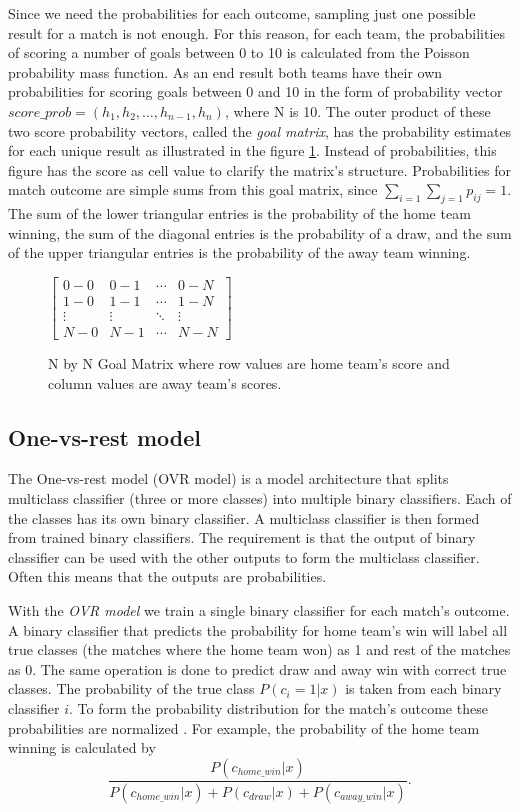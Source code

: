 Since we need the probabilities for each outcome, sampling just one possible result for a match is not enough. For this reason, for each team, the probabilities of scoring a number of goals between 0 to 10 is calculated from the Poisson probability mass function. As an end result both teams have their own probabilities for scoring goals between 0 and 10 in the form of probability vector $score\_prob = \left( h _ { 1 } , h _ { 2 } , \dots , h _ { n - 1 } , h _ { n } \right)$, where N is 10. The outer product of these two score probability vectors, called the \textit{goal matrix}, has the probability estimates for each unique result as illustrated in the figure \ref{fig:goal_matrix}. Instead of probabilities, this figure has the score as cell value to clarify the matrix's structure. Probabilities for match outcome are simple sums from this goal matrix, since $\sum_{i=1}\sum_{j=1}p_{ij} = 1$. The sum of the lower triangular entries is the probability of the home team winning, the sum of the diagonal entries is the probability of a draw, and the sum of the upper triangular entries is the probability of the away team winning.
\begin{figure}
    $\begin{bmatrix}
    0-0 & 0-1 & \cdots & 0-N \\
    1-0 & 1-1 & \cdots   &1-N \\
    \vdots & \vdots   & \ddots & \vdots \\
    N-0 & N-1 & \cdots & N-N\end{bmatrix}$
\caption{N by N Goal Matrix where row values are home team's score and column values are away team's scores.}
\label{fig:goal_matrix}
\end{figure}

\subsection{One-vs-rest model}
The One-vs-rest model (OVR model) is a model architecture that splits multiclass classifier (three or more classes) into multiple binary classifiers. Each of the classes has its own binary classifier. A multiclass classifier is then formed from trained binary classifiers. The requirement is that the output of binary classifier can be used with the other outputs to form the multiclass classifier. Often this means that the outputs are probabilities.

With the \textit{OVR model} we train a single binary classifier for each match's outcome. A binary classifier that predicts the probability for home team's win will label all true classes (the matches where the home team won) as 1 and rest of the matches as 0. The same operation is done to predict draw and away win with correct true classes. The probability of the true class $P(c_i = 1 | x)$ is taken from each binary classifier $i$. To form the probability distribution for the match's outcome these probabilities are normalized \cite{zadrozny2002transforming}. For example, the probability of the home team winning is calculated by
\begin{equation}
\frac{P(c_{home\_win}| x)}{P(c_{home\_win}| x) + P(c_{draw}| x) + P(c_{away\_win}| x)} \text{.}
\end{equation}


